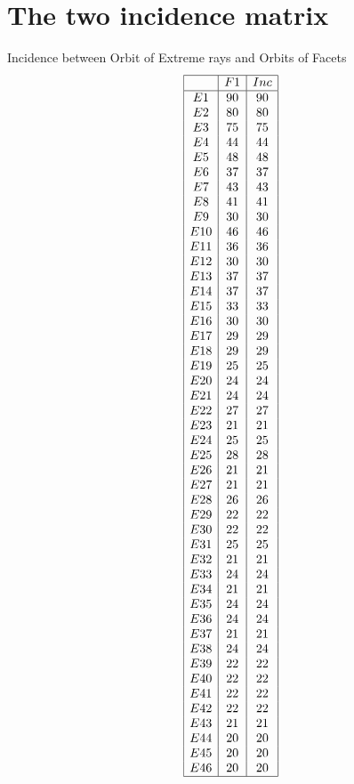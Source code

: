 \documentclass[12pt]{article}
\begin{document}
\section{The two incidence matrix}
Incidence between Orbit of Extreme rays and Orbits of Facets
\begin{equation*}
\begin{array}{|c|c|c|}
\hline
&F1&Inc\\
\hline
E1&90&90\\
E2&80&80\\
E3&75&75\\
E4&44&44\\
E5&48&48\\
E6&37&37\\
E7&43&43\\
E8&41&41\\
E9&30&30\\
E10&46&46\\
E11&36&36\\
E12&30&30\\
E13&37&37\\
E14&37&37\\
E15&33&33\\
E16&30&30\\
E17&29&29\\
E18&29&29\\
E19&25&25\\
E20&24&24\\
E21&24&24\\
E22&27&27\\
E23&21&21\\
E24&25&25\\
E25&28&28\\
E26&21&21\\
E27&21&21\\
E28&26&26\\
E29&22&22\\
E30&22&22\\
E31&25&25\\
E32&21&21\\
E33&24&24\\
E34&21&21\\
E35&24&24\\
E36&24&24\\
E37&21&21\\
E38&24&24\\
E39&22&22\\
E40&22&22\\
E41&22&22\\
E42&22&22\\
E43&21&21\\
E44&20&20\\
E45&20&20\\
E46&20&20\\
\hline
\end{array}
\end{equation*}
\end{document}

